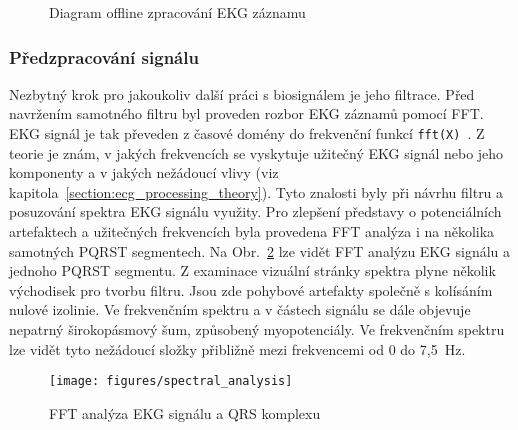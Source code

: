 \begin{figure}[H]
    \centering
    \caption{Diagram offline zpracování EKG záznamu}
    \label{fig:diagram_offline_processing}
\end{figure}

\subsubsection{Předzpracování signálu}
\label{section:preprocessing}
Nezbytný krok pro jakoukoliv další práci s biosignálem je jeho filtrace. Před
navržením samotného filtru byl proveden rozbor EKG záznamů pomocí FFT. EKG
signál je tak převeden z časové domény do frekvenční funkcí
\texttt{fft(X)}~\cite{matlabFFT}. Z teorie je znám, v jakých frekvencích se
vyskytuje užitečný EKG signál nebo jeho komponenty a v jakých nežádoucí vlivy
(viz kapitola~\ref{section:ecg_processing_theory}). Tyto znalosti byly při
návrhu filtru a posuzování spektra EKG signálu využity. Pro zlepšení představy o
potenciálních artefaktech a užitečných frekvencích byla provedena FFT analýza i
na několika samotných PQRST segmentech. Na Obr.~\ref{fig:spectral_analysis} lze
vidět FFT analýzu EKG signálu a jednoho PQRST segmentu. Z examinace vizuální
stránky spektra plyne několik východisek pro tvorbu filtru. Jsou zde pohybové
artefakty společně s kolísáním nulové izolinie. Ve frekvenčním spektru a v
částech signálu se dále objevuje nepatrný širokopásmový šum, způsobený
myopotenciály. Ve frekvenčním spektru lze vidět tyto nežádoucí složky přibližně
mezi frekvencemi od 0 do 7,5~\si\Hz.

\begin{figure}[h]
    \begin{center}
        \texttt{[image: figures/spectral\_analysis]}
        \caption{FFT analýza EKG signálu a QRS komplexu}
        \label{fig:spectral_analysis}
    \end{center}
\end{figure}

